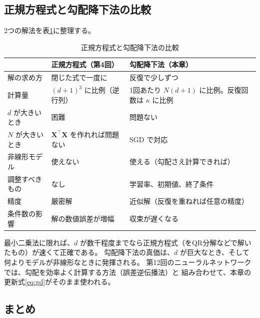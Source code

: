\subsection{正規方程式と勾配降下法の比較}

2つの解法を表\ref{tab:ne-vs-gd}に整理する。

\begin{table}[H]
  \centering
  \caption{正規方程式と勾配降下法の比較}
  \label{tab:ne-vs-gd}
  \begin{tabular}{l|p{5.0cm}|p{5.0cm}}
    \hline
     & 正規方程式（第4回） & 勾配降下法（本章） \\
    \hline\hline
    解の求め方 & 閉じた式で一度に & 反復で少しずつ \\
    \hline
    計算量 & $(d+1)^3$ に比例（逆行列） & 1回あたり $N(d+1)$ に比例。反復回数は $\kappa$ に比例 \\
    \hline
    $d$ が大きいとき & 困難 & 問題ない \\
    \hline
    $N$ が大きいとき & $\bm{X}^\top\bm{X}$ を作れれば問題ない & SGD で対応 \\
    \hline
    非線形モデル & 使えない & 使える（勾配さえ計算できれば） \\
    \hline
    調整すべきもの & なし & 学習率、初期値、終了条件 \\
    \hline
    精度 & 厳密解 & 近似解（反復を重ねれば任意の精度） \\
    \hline
    条件数の影響 & 解の数値誤差が増幅 & 収束が遅くなる \\
    \hline
  \end{tabular}
\end{table}

最小二乗法に限れば、$d$ が数千程度までなら正規方程式（をQR分解などで解いたもの）が速くて正確である。
勾配降下法の真価は、$d$ が巨大なとき、そして何よりモデルが非線形なときに発揮される。
第12回のニューラルネットワークでは、勾配を効率よく計算する方法（誤差逆伝播法）と
組み合わせて、本章の更新式\eqref{eq:gd}がそのまま使われる。


\subsection{まとめ}

